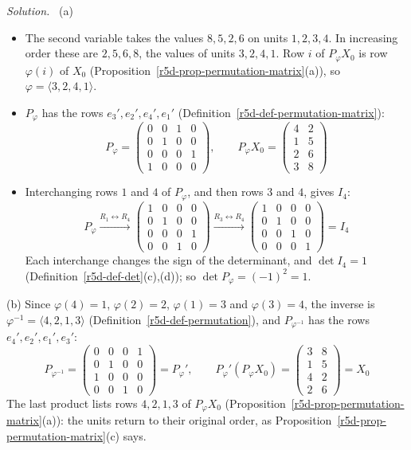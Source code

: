\documentclass[12pt]{article}
\theoremstyle{definition}
\newenvironment{solution}{\par\noindent\textit{Solution.}\ }{\par\smallskip}
\begin{document}
\begin{solution}
(a)
\begin{itemize}
\item The second variable takes the values \(8,5,2,6\) on units \(1,2,3,4\). In increasing order these are
\(2,5,6,8\), the values of units \(3,2,4,1\). Row \(i\) of \(P_\varphi X_0\) is row \(\varphi(i)\) of \(X_0\)
(Proposition~\ref{r5d-prop-permutation-matrix}(a)), so \(\varphi=\langle3,2,4,1\rangle\).
\item \(P_\varphi\) has the rows \(e_3',e_2',e_4',e_1'\) (Definition~\ref{r5d-def-permutation-matrix}):
\[
P_\varphi=\begin{pmatrix}0&0&1&0\\0&1&0&0\\0&0&0&1\\1&0&0&0\end{pmatrix},\qquad
P_\varphi X_0=\begin{pmatrix}4&2\\1&5\\2&6\\3&8\end{pmatrix}
\]
\item Interchanging rows \(1\) and \(4\) of \(P_\varphi\), and then rows \(3\) and \(4\), gives \(I_4\):
\[
P_\varphi\xrightarrow{R_1\leftrightarrow R_4}
\begin{pmatrix}1&0&0&0\\0&1&0&0\\0&0&0&1\\0&0&1&0\end{pmatrix}
\xrightarrow{R_3\leftrightarrow R_4}
\begin{pmatrix}1&0&0&0\\0&1&0&0\\0&0&1&0\\0&0&0&1\end{pmatrix}=I_4
\]
Each interchange changes the sign of the determinant, and \(\det I_4=1\) (Definition~\ref{r5d-def-det}(c),(d)); so
\(\det P_\varphi=(-1)^2=1\).
\end{itemize}

(b) Since \(\varphi(4)=1\), \(\varphi(2)=2\), \(\varphi(1)=3\) and \(\varphi(3)=4\), the inverse is
\(\varphi^{-1}=\langle4,2,1,3\rangle\) (Definition~\ref{r5d-def-permutation}), and \(P_{\varphi^{-1}}\) has the rows
\(e_4',e_2',e_1',e_3'\):
\[
P_{\varphi^{-1}}=\begin{pmatrix}0&0&0&1\\0&1&0&0\\1&0&0&0\\0&0&1&0\end{pmatrix}=P_\varphi',\qquad
P_\varphi'(P_\varphi X_0)=\begin{pmatrix}3&8\\1&5\\4&2\\2&6\end{pmatrix}=X_0
\]
The last product lists rows \(4,2,1,3\) of \(P_\varphi X_0\) (Proposition~\ref{r5d-prop-permutation-matrix}(a)): the
units return to their original order, as Proposition~\ref{r5d-prop-permutation-matrix}(c) says.
\end{solution}
\end{document}
